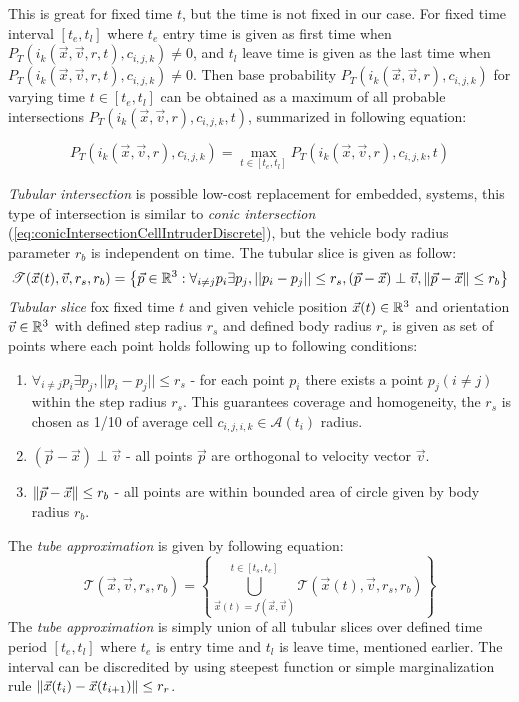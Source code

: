 This is great for fixed time $t$, but the time is not fixed in our case. For fixed time interval $[t_e,t_l]$ where $t_e$ entry time is given as first time when $P_T(i_k(\vec{x},\vec{v},r,t),c_{i,j,k})\neq 0$, and $t_l$ leave time is given as the last time when $P_T(i_k(\vec{x},\vec{v},r,t),c_{i,j,k}) \neq 0$. Then base probability $P_T(i_k(\vec{x},\vec{v},r),c_{i,j,k})$ for varying time $t \in [t_e,t_l]$ can be obtained as a maximum of all probable intersections $P_T(i_k(\vec{x},\vec{v},r),c_{i,j,k},t)$, summarized in following equation:

\begin{equation}
    P_T(i_k(\vec{x},\vec{v},r),c_{i,j,k}) = \max_{t\in [t_e,t_l]} P_T(i_k(\vec{x},\vec{v},r),c_{i,j,k},t)
\end{equation}

\noindent\emph{Tubular intersection} is possible low-cost replacement for embedded, systems, this type of intersection is similar to \emph{conic intersection} (\ref{eq:conicIntersectionCellIntruderDiscrete}), but the vehicle body radius parameter $r_b$ is independent on time. The tubular slice is given as follow: 
\begin{equation}
    \mathscr{T}(\vec{x}(t),\vec{v},r_s,r_b)=\left\{\vec{p}\in\mathbb{R}^3:\forall_{i\neq j} p_i \exists p_j, ||p_i-p_j|| \le r_s, \left(\vec{p} -\vec{x}\right)\perp \vec{v},  \left\lVert\vec{p}-\vec{x}\right\rVert\le r_b\right\}
\end{equation}
\noindent\emph{Tubular slice} fox fixed time $t$ and given vehicle position $\vec{x}(t)\in\mathbb{R}^3$ and orientation $\vec{v}\in\mathbb{R}^3$ with defined step radius $r_s$ and defined body radius $r_r$ is given as set of points where each point holds following up to following conditions:
\begin{enumerate}
    \item $\forall_{i\neq j} p_i \exists p_j, ||p_i-p_j|| \le r_s$ - for each point $p_i$ there exists a point $p_j(i \neq j)$ within the step radius $r_s$. This guarantees coverage and homogeneity, the $r_s$ is chosen as 1/10 of average cell $c_{i,j,i,k}\in\mathscr{A}(t_i)$ radius.
    \item $\left(\vec{p} -\vec{x}\right)\perp \vec{v}$ - all points $\vec{p}$ are orthogonal  to velocity vector $\vec{v}$.
    \item $\left\lVert\vec{p}-\vec{x}\right\rVert\le r_b$ - all points are within bounded area of circle given by body radius $r_b$.
\end{enumerate}
\noindent The \emph{tube approximation} is given by following equation:
\begin{equation}
    \mathscr{T}(\vec{x},\vec{v},r_s,r_b) = \left\{\bigcup_{\vec{x}(t)=f(\vec{x},\vec{v})}^{t\in[t_s,t_e]} \mathscr{T}(\vec{x}(t),\vec{v},r_s,r_b)\right\}
\end{equation}
\noindent The \emph{tube approximation} is simply union of all tubular slices over defined time period $[t_e,t_l]$ where $t_e$ is entry time and $t_l$ is leave time, mentioned earlier. The interval can be discredited by using steepest function or simple marginalization rule $\left\lVert\vec{x}(t_i) - \vec{x}(t_{i+1})\right\rVert \le r_r$. 

